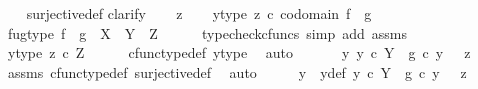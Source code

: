 \begin{isabellebody}
%
\isadelimproof
\ \ %
\endisadelimproof
%
\isatagproof
{}\isamarkupfalse%
\ surjective{\isacharunderscore}{\kern0pt}def\isanewline
{}\isamarkupfalse%
{\isacharparenleft}{\kern0pt}clarify{\isacharparenright}{\kern0pt}\isanewline
\ \ \isamarkupfalse%
\ z\isanewline
\ \ \isamarkupfalse%
\ y{\isacharunderscore}{\kern0pt}type{\isacharcolon}{\kern0pt}\ {\isachardoublequoteopen}z\ {\isasymin}\isactrlsub c\ codomain\ {\isacharparenleft}{\kern0pt}f\ {\isasymamalg}\ g{\isacharparenright}{\kern0pt}{\isachardoublequoteclose}\isanewline
\ \ \isamarkupfalse%
\ fug{\isacharunderscore}{\kern0pt}type{\isacharcolon}{\kern0pt}\ {\isachardoublequoteopen}{\isacharparenleft}{\kern0pt}f\ {\isasymamalg}\ g{\isacharparenright}{\kern0pt}\ {\isacharcolon}{\kern0pt}\ {\isacharparenleft}{\kern0pt}X\ {\isasymCoprod}\ Y{\isacharparenright}{\kern0pt}\ {\isasymrightarrow}\ Z{\isachardoublequoteclose}\isanewline
\ \ \ \ \isamarkupfalse%
\ {\isacharparenleft}{\kern0pt}typecheck{\isacharunderscore}{\kern0pt}cfuncs{\isacharcomma}{\kern0pt}\ simp\ add{\isacharcolon}{\kern0pt}\ assms{\isacharparenright}{\kern0pt}\isanewline
\ \ \isamarkupfalse%
\ \isamarkupfalse%
\ y{\isacharunderscore}{\kern0pt}type{}{\isacharcolon}{\kern0pt}\ {\isachardoublequoteopen}z\ {\isasymin}\isactrlsub c\ Z{\isachardoublequoteclose}\isanewline
\ \ \ \ \isamarkupfalse%
\ cfunc{\isacharunderscore}{\kern0pt}type{\isacharunderscore}{\kern0pt}def\ y{\isacharunderscore}{\kern0pt}type\ \isamarkupfalse%
\ auto\isanewline
\ \ \isamarkupfalse%
\ \isamarkupfalse%
\ {\isachardoublequoteopen}{\isasymexists}\ y{\isachardot}{\kern0pt}\ y\ {\isasymin}\isactrlsub c\ Y\ {\isasymand}\ g\ {\isasymcirc}\isactrlsub c\ y\ \ {\isacharequal}{\kern0pt}\ z{\isachardoublequoteclose}\isanewline
\ \ \ \ \isamarkupfalse%
\ assms{\isacharparenleft}{\kern0pt}{}{\isacharcomma}{\kern0pt}{}{\isacharparenright}{\kern0pt}\ cfunc{\isacharunderscore}{\kern0pt}type{\isacharunderscore}{\kern0pt}def\ surjective{\isacharunderscore}{\kern0pt}def\ \isamarkupfalse%
\ auto\isanewline
\ \ \isamarkupfalse%
\ \isamarkupfalse%
\ y\ \ y{\isacharunderscore}{\kern0pt}def{\isacharcolon}{\kern0pt}\ {\isachardoublequoteopen}y\ {\isasymin}\isactrlsub c\ Y\ {\isasymand}\ g\ {\isasymcirc}\isactrlsub c\ y\ \ {\isacharequal}{\kern0pt}\ z{\isachardoublequoteclose}\isanewline

\end{isabellebody}

